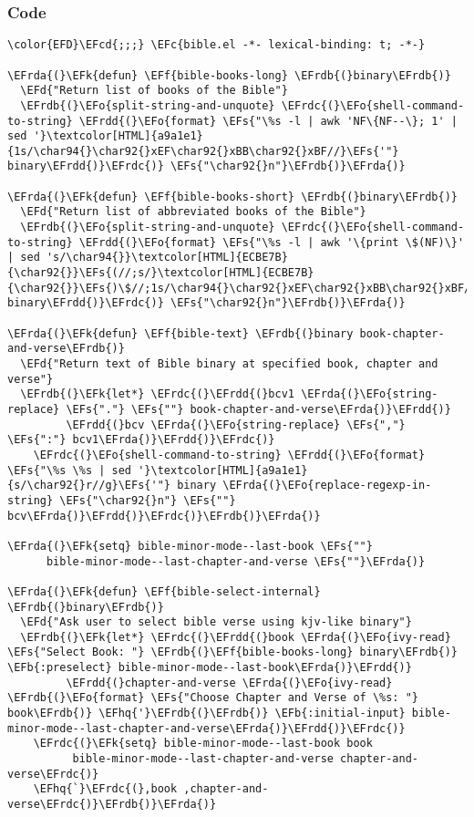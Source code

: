 \documentclass[a4wide,10pt]{article}
\newcommand{\EFc}[1]{\textcolor{EFc}{#1}} %
\newcommand{\EFcd}[1]{\textcolor{EFcd}{#1}} %
\newcommand{\EFs}[1]{\textcolor{EFs}{#1}} %
\newcommand{\EFd}[1]{\textcolor{EFd}{#1}} %
\newcommand{\EFk}[1]{\textcolor{EFk}{#1}} %
\newcommand{\EFb}[1]{\textcolor{EFb}{#1}} %
\newcommand{\EFf}[1]{\textcolor{EFf}{#1}} %
\newcommand{\EFo}[1]{\textcolor{EFo}{#1}} %
\newcommand{\EFhq}[1]{\textcolor{EFhq}{#1}} %
\newcommand{\EFrda}[1]{\textcolor{EFrda}{#1}} %
\newcommand{\EFrdb}[1]{\textcolor{EFrdb}{#1}} %
\newcommand{\EFrdc}[1]{\textcolor{EFrdc}{#1}} %
\newcommand{\EFrdd}[1]{\textcolor{EFrdd}{#1}} %
\begin{document}
\subsubsection{Code}
\label{sec:orgd47e3df}
\begin{Code}
\begin{Verbatim}
\color{EFD}\EFcd{;;;} \EFc{bible.el -*- lexical-binding: t; -*-}

\EFrda{(}\EFk{defun} \EFf{bible-books-long} \EFrdb{(}binary\EFrdb{)}
  \EFd{"Return list of books of the Bible"}
  \EFrdb{(}\EFo{split-string-and-unquote} \EFrdc{(}\EFo{shell-command-to-string} \EFrdd{(}\EFo{format} \EFs{"\%s -l | awk 'NF\{NF--\}; 1' | sed '}\textcolor[HTML]{a9a1e1}{1s/\char94{}\char92{}xEF\char92{}xBB\char92{}xBF//}\EFs{'"} binary\EFrdd{)}\EFrdc{)} \EFs{"\char92{}n"}\EFrdb{)}\EFrda{)}

\EFrda{(}\EFk{defun} \EFf{bible-books-short} \EFrdb{(}binary\EFrdb{)}
  \EFd{"Return list of abbreviated books of the Bible"}
  \EFrdb{(}\EFo{split-string-and-unquote} \EFrdc{(}\EFo{shell-command-to-string} \EFrdd{(}\EFo{format} \EFs{"\%s -l | awk '\{print \$(NF)\}' | sed 's/\char94{}}\textcolor[HTML]{ECBE7B}{\char92{}}\EFs{(//;s/}\textcolor[HTML]{ECBE7B}{\char92{}}\EFs{)\$//;1s/\char94{}\char92{}xEF\char92{}xBB\char92{}xBF//'"} binary\EFrdd{)}\EFrdc{)} \EFs{"\char92{}n"}\EFrdb{)}\EFrda{)}

\EFrda{(}\EFk{defun} \EFf{bible-text} \EFrdb{(}binary book-chapter-and-verse\EFrdb{)}
  \EFd{"Return text of Bible binary at specified book, chapter and verse"}
  \EFrdb{(}\EFk{let*} \EFrdc{(}\EFrdd{(}bcv1 \EFrda{(}\EFo{string-replace} \EFs{"."} \EFs{""} book-chapter-and-verse\EFrda{)}\EFrdd{)}
         \EFrdd{(}bcv \EFrda{(}\EFo{string-replace} \EFs{","} \EFs{":"} bcv1\EFrda{)}\EFrdd{)}\EFrdc{)}
    \EFrdc{(}\EFo{shell-command-to-string} \EFrdd{(}\EFo{format} \EFs{"\%s \%s | sed '}\textcolor[HTML]{a9a1e1}{s/\char92{}r//g}\EFs{'"} binary \EFrda{(}\EFo{replace-regexp-in-string} \EFs{"\char92{}n"} \EFs{""} bcv\EFrda{)}\EFrdd{)}\EFrdc{)}\EFrdb{)}\EFrda{)}

\EFrda{(}\EFk{setq} bible-minor-mode--last-book \EFs{""}
      bible-minor-mode--last-chapter-and-verse \EFs{""}\EFrda{)}

\EFrda{(}\EFk{defun} \EFf{bible-select-internal} \EFrdb{(}binary\EFrdb{)}
  \EFd{"Ask user to select bible verse using kjv-like binary"}
  \EFrdb{(}\EFk{let*} \EFrdc{(}\EFrdd{(}book \EFrda{(}\EFo{ivy-read} \EFs{"Select Book: "} \EFrdb{(}\EFf{bible-books-long} binary\EFrdb{)} \EFb{:preselect} bible-minor-mode--last-book\EFrda{)}\EFrdd{)}
         \EFrdd{(}chapter-and-verse \EFrda{(}\EFo{ivy-read} \EFrdb{(}\EFo{format} \EFs{"Choose Chapter and Verse of \%s: "} book\EFrdb{)} \EFhq{'}\EFrdb{(}\EFrdb{)} \EFb{:initial-input} bible-minor-mode--last-chapter-and-verse\EFrda{)}\EFrdd{)}\EFrdc{)}
    \EFrdc{(}\EFk{setq} bible-minor-mode--last-book book
          bible-minor-mode--last-chapter-and-verse chapter-and-verse\EFrdc{)}
    \EFhq{`}\EFrdc{(},book ,chapter-and-verse\EFrdc{)}\EFrdb{)}\EFrda{)}



\end{Verbatim}
\end{Code}
\end{document}
